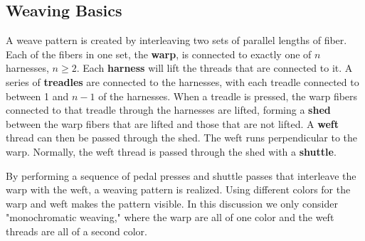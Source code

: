 \documentclass[10pt,]{article}
\newcommand{\terminology}[1]{\textbf{#1}}
\theoremstyle{plain}
\begin{document}
\subsection[Weaving Basics]{Weaving Basics}\label{ss-weaving-def}
A weave pattern is created by interleaving two sets of parallel lengths of fiber. Each of the fibers in one set, the \terminology{warp}, is connected to exactly one of \(n\) harnesses, \(n \geq 2\). Each \terminology{harness} will lift the threads that are connected to it.  A series of \terminology{treadles} are connected to the harnesses, with each treadle connected to between 1 and \(n-1\) of the harnesses. When a treadle is pressed, the warp fibers connected to that treadle through the harnesses are lifted, forming a \terminology{shed} between the warp fibers that are lifted and those that are not lifted. A \terminology{weft} thread can then be passed through the shed.  The weft runs perpendicular to the warp. Normally, the weft thread is passed through the shed with a \terminology{shuttle}. %
\par
By performing a sequence of pedal presses and shuttle passes that interleave the warp with the weft, a weaving pattern is realized.  Using different colors for the warp and weft makes the pattern visible. In this discussion we only consider "monochromatic weaving," where the warp are all of one color and the weft threads are all of a second color.%
\typeout{************************************************}
\typeout{************************************************}
\end{document}
